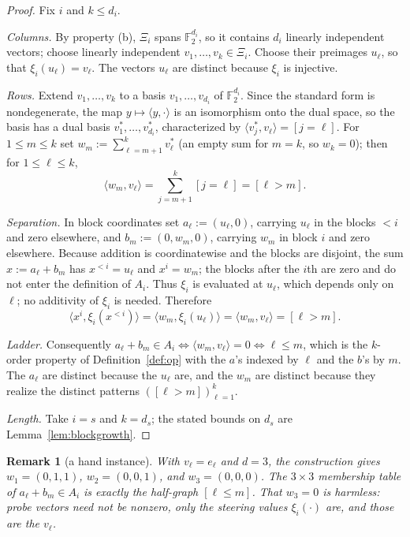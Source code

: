 \documentclass[10pt,a4paper]{amsart}
\newtheorem{remark}[theorem]{Remark}
\numberwithin{theorem}{section}
\newcommand{\F}{\mathbb{F}}
\newcommand{\inner}[2]{\langle #1,#2\rangle}
\newcommand{\Xii}{\Xi}
\begin{document}
\begin{proof}
Fix $i$ and $k\le d_i$.

\emph{Columns.} By property (b), $\Xii_i$ spans $\F_2^{d_i}$, so it contains
$d_i$ linearly independent vectors; choose linearly independent
$v_1,\dots,v_k\in\Xii_i$.  Choose their preimages $u_\ell$, so that
$\xi_i(u_\ell)=v_\ell$.  The vectors $u_\ell$ are distinct because $\xi_i$
is injective.

\emph{Rows.} Extend $v_1,\dots,v_k$ to a basis $v_1,\dots,v_{d_i}$ of
$\F_2^{d_i}$. Since the standard form is nondegenerate, the map
$y\mapsto\inner{y}{\cdot}$ is an isomorphism onto the dual space, so the basis
has a dual basis $v_1^{*},\dots,v_{d_i}^{*}$, characterized by
$\inner{v_j^{*}}{v_\ell}=[j=\ell]$. For $1\le m\le k$ set
$w_m:=\sum_{\ell=m+1}^{k}v_\ell^{*}$ (an empty sum for $m=k$, so $w_k=0$);
then for $1\le\ell\le k$,
\[
  \inner{w_m}{v_\ell}=\sum_{j=m+1}^{k}[j=\ell]=[\ell>m].
\]

\emph{Separation.} In block coordinates set $a_\ell:=(u_\ell,0)$, carrying
$u_\ell$ in the blocks $<i$ and zero elsewhere, and $b_m:=(0,w_m,0)$, carrying
$w_m$ in block $i$ and zero elsewhere. Because addition is coordinatewise and
the blocks are disjoint, the sum $x:=a_\ell+b_m$ has $x^{<i}=u_\ell$ and
$x^i=w_m$; the blocks after the $i$th are zero and do not enter the definition
of $A_i$. Thus $\xi_i$ is evaluated at $u_\ell$, which depends only on $\ell$; no
additivity of $\xi_i$ is needed. Therefore
\[
  \inner{x^i}{\xi_i(x^{<i})}=\inner{w_m}{\xi_i(u_\ell)}
  =\inner{w_m}{v_\ell}=[\ell>m].
\]

\emph{Ladder.} Consequently $a_\ell+b_m\in A_i\iff\inner{w_m}{v_\ell}=0\iff
\ell\le m$, which is the $k$-order property of Definition~\ref{def:op} with the
$a$'s indexed by $\ell$ and the $b$'s by $m$. The $a_\ell$ are distinct because
the $u_\ell$ are, and the $w_m$ are distinct because they realize the distinct
patterns $([\ell>m])_{\ell=1}^{k}$.

\emph{Length.} Take $i=s$ and $k=d_s$; the stated bounds on $d_s$ are
Lemma~\ref{lem:blockgrowth}.
\end{proof}

\begin{remark}[a hand instance]\label{rem:hand}
With $v_\ell=e_\ell$ and $d=3$, the construction gives
$w_1=(0,1,1)$, $w_2=(0,0,1)$, and $w_3=(0,0,0)$.  The $3\times3$ membership
table of $a_\ell+b_m\in A_i$ is
exactly the half-graph $[\ell\le m]$. That $w_3=0$ is harmless: probe vectors
need not be nonzero, only the steering values $\xi_i(\cdot)$ are, and those are
the $v_\ell$.
\end{remark}
\end{document}
